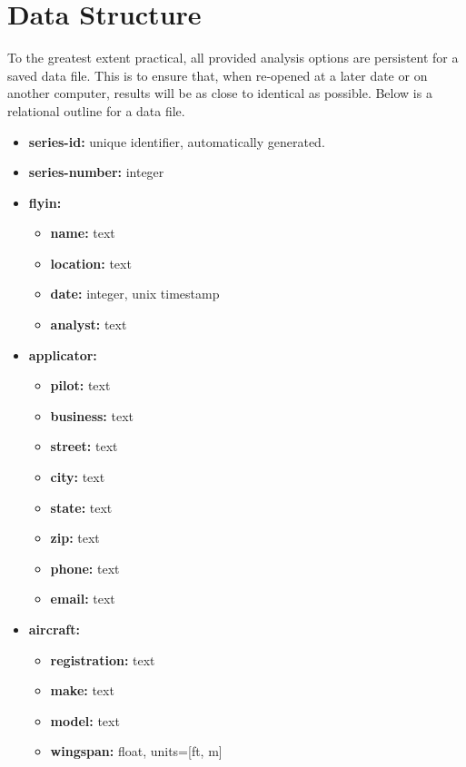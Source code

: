 \documentclass[10pt,letterpaper,titlepage]{article}
\begin{document}
    \section{Data Structure}
    \label{sec:data}
    To the greatest extent practical, all provided analysis options are persistent for a saved data file. This is to ensure that, when re-opened at a later date or on another computer, results will be as close to identical as possible. Below is a relational outline for a data file.
    \begin{itemize}
        \item \textbf{series-id:} unique identifier, automatically generated.
        \item \textbf{series-number:} integer
        \item \textbf{flyin:}
        \begin{itemize}
            \item \textbf{name:} text
            \item \textbf{location:} text
            \item \textbf{date:} integer, unix timestamp
            \item \textbf{analyst:} text
        \end{itemize}
        \item \textbf{applicator:} 
        \begin{itemize}
            \item \textbf{pilot:} text
            \item \textbf{business:} text
            \item \textbf{street:} text
            \item \textbf{city:} text
            \item \textbf{state:} text
            \item \textbf{zip:} text
            \item \textbf{phone:} text
            \item \textbf{email:} text
        \end{itemize}
        \item \textbf{aircraft:} 
        \begin{itemize}
            \item \textbf{registration:} text
            \item \textbf{make:} text
            \item \textbf{model:} text
            \item \textbf{wingspan:} float, units=[ft, m]

\end{itemize}
\end{itemize}
\end{document}
